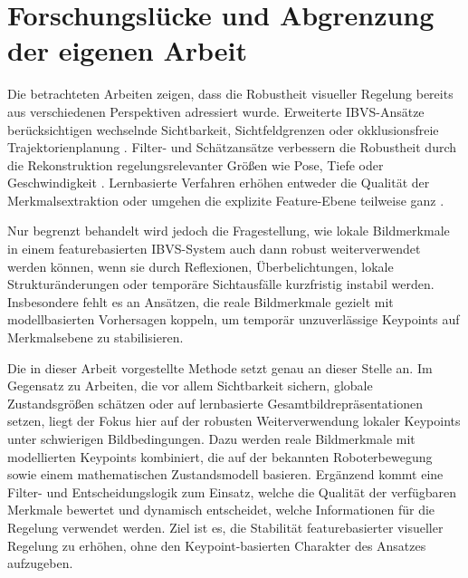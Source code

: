 \section{Forschungslücke und Abgrenzung der eigenen Arbeit}
\label{sec:gap_and_delimitation}

Die betrachteten Arbeiten zeigen, dass die Robustheit visueller Regelung bereits aus verschiedenen Perspektiven adressiert wurde. Erweiterte \ac{IBVS}-Ansätze berücksichtigen wechselnde Sichtbarkeit, Sichtfeldgrenzen oder okklusionsfreie Trajektorienplanung \cite{garcia2005continuous, bechlioulis2019robust, zhang2023occlusionfree}. Filter- und Schätzansätze verbessern die Robustheit durch die Rekonstruktion regelungsrelevanter Größen wie Pose, Tiefe oder Geschwindigkeit \cite{janabi2010kalman, chang2021dynamic}. Lernbasierte Verfahren erhöhen entweder die Qualität der Merkmalsextraktion oder umgehen die explizite Feature-Ebene teilweise ganz \cite{potje2024xfeat, detone2018superpoint, sarlin2020superglue, revaud2019r2d2, bateux2017visual}.

Nur begrenzt behandelt wird jedoch die Fragestellung, wie lokale Bildmerkmale in einem featurebasierten \ac{IBVS}-System auch dann robust weiterverwendet werden können, wenn sie durch Reflexionen, Überbelichtungen, lokale Strukturänderungen oder temporäre Sichtausfälle kurzfristig instabil werden. Insbesondere fehlt es an Ansätzen, die reale Bildmerkmale gezielt mit modellbasierten Vorhersagen koppeln, um temporär unzuverlässige Keypoints auf Merkmalsebene zu stabilisieren.

Die in dieser Arbeit vorgestellte Methode setzt genau an dieser Stelle an. Im Gegensatz zu Arbeiten, die vor allem Sichtbarkeit sichern, globale Zustandsgrößen schätzen oder auf lernbasierte Gesamtbildrepräsentationen setzen, liegt der Fokus hier auf der robusten Weiterverwendung lokaler Keypoints unter schwierigen Bildbedingungen. Dazu werden reale Bildmerkmale mit modellierten Keypoints kombiniert, die auf der bekannten Roboterbewegung sowie einem mathematischen Zustandsmodell basieren. Ergänzend kommt eine Filter- und Entscheidungslogik zum Einsatz, welche die Qualität der verfügbaren Merkmale bewertet und dynamisch entscheidet, welche Informationen für die Regelung verwendet werden. Ziel ist es, die Stabilität featurebasierter visueller Regelung zu erhöhen, ohne den Keypoint-basierten Charakter des Ansatzes aufzugeben.
